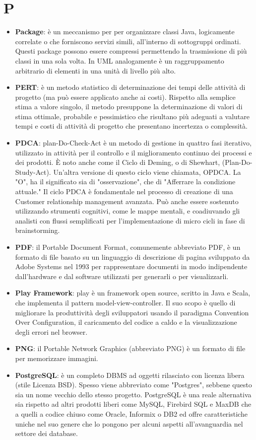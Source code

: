 \section{P}
\begin{itemize} 
	\item
	\textbf{Package}: è un meccanismo per per organizzare classi Java, logicamente correlate o che forniscono servizi simili, all’interno di sottogruppi ordinati. Questi package possono essere compressi permettendo la trasmissione di più classi in una sola volta.
	In UML analogamente è un raggruppamento arbitrario di elementi in una unità di livello più alto.
	\item
	\textbf{PERT}: è un metodo statistico di determinazione dei tempi delle attività di progetto (ma può essere applicato anche ai costi). Rispetto alla semplice stima a valore singolo, il metodo presuppone la determinazione di valori di stima ottimale, probabile e pessimistico che risultano più adeguati a valutare tempi e costi di attività di progetto che presentano incertezza o complessità.
	\item
	\textbf{PDCA}: plan-Do-Check-Act è un metodo di gestione in quattro fasi iterativo, utilizzato in attività per il controllo e il miglioramento continuo dei processi e dei prodotti. È noto anche come il Ciclo di Deming, o di Shewhart, (Plan-Do-Study-Act). Un'altra versione di questo ciclo viene chiamata, OPDCA. La "O", ha il significato sia di "osservazione", che di "Afferrare la condizione attuale." Il ciclo PDCA è fondamentale nel processo di creazione di una Customer relationship management avanzata. Può anche essere sostenuto utilizzando strumenti cognitivi, come le mappe mentali, e coadiuvando gli analisti con flussi semplificati per l'implementazione di micro cicli in fase di brainstorming.
	\item
	\textbf{PDF}: il Portable Document Format, comunemente abbreviato PDF, è un formato di file basato su un linguaggio di descrizione di pagina sviluppato da Adobe Systems nel 1993 per rappresentare documenti in modo indipendente dall’hardware e dal software utilizzati per generarli o per visualizzarli.
	\item
	\textbf{Play Framework}: play è un framework open source, scritto in Java e Scala, che implementa il pattern model-view-controller. Il suo scopo è quello di migliorare la produttività degli sviluppatori usando il paradigma Convention Over Configuration, il caricamento del codice a caldo e la visualizzazione degli errori nel browser.
	\item
	\textbf{PNG}: il Portable Network Graphics (abbreviato PNG) è un formato di file per memorizzare immagini.
	\item
	\textbf{PostgreSQL}: è un completo DBMS ad oggetti rilasciato con licenza libera (stile Licenza BSD). Spesso viene abbreviato come "Postgres", sebbene questo sia un nome vecchio dello stesso progetto.
	PostgreSQL è una reale alternativa sia rispetto ad altri prodotti liberi come MySQL, Firebird SQL e MaxDB che a quelli a codice chiuso come Oracle, Informix o DB2 ed offre caratteristiche uniche nel suo genere che lo pongono per alcuni aspetti all'avanguardia nel settore dei database.
\end{itemize}

